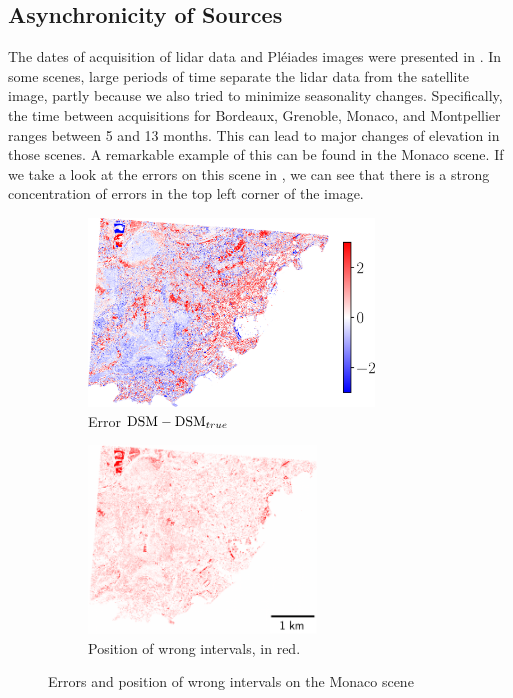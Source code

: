 \subsection{Asynchronicity of Sources}
The dates of acquisition of \acrshort{lidar} data and Pléiades images were presented in . In some scenes, large periods of time separate the \acrshort{lidar} data from the satellite image, partly because we also tried to minimize seasonality changes. Specifically, the time between acquisitions for Bordeaux, Grenoble, Monaco, and Montpellier ranges between 5 and 13 months. This can lead to major changes of elevation in those scenes. A remarkable example of this can be found in the Monaco scene. If we take a look at the errors on this scene in , we can see that there is a strong concentration of errors in the top left corner of the image. 

\begin{figure}
    \begin{subfigure}[t]{0.495\linewidth}
        \flushleft
        \includegraphics[height=5cm]{Images/Chap_6/Monaco_errors.png}
        \caption{Error $\mathrm{DSM}-\mathrm{DSM}_{true}$}
        \label{fig:Monaco_errors}
    \end{subfigure}
    \begin{subfigure}[t]{0.495\linewidth}
        \flushright
        \includegraphics[height=5cm]{Images/Chap_6/Monaco_wrong_intervals.png}
        \caption{Position of wrong intervals, in red.}
        \label{fig:Monaco_wrong_intervals}
    \end{subfigure}
    \caption{Errors and position of wrong intervals on the Monaco scene}
    \label{fig:Monaco_errors_global}
\end{figure}

